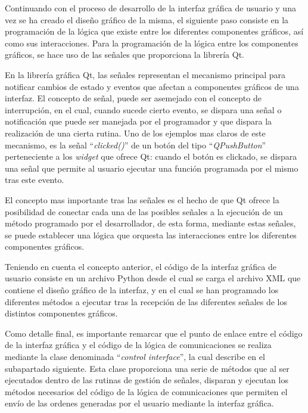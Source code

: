 Continuando con el proceso de desarrollo de la interfaz gráfica de usuario y una vez se ha creado el diseño gráfico de la misma, el siguiente paso consiste en la programación de la lógica que existe entre los diferentes componentes gráficos, así como sus interacciones. Para la programación de la lógica entre los componentes gráficos, se hace uso de las señales que proporciona la librería Qt.

En la librería gráfica Qt, las señales representan el mecanismo principal para notificar cambios de estado y eventos que afectan a componentes gráficos de una interfaz. El concepto de señal, puede ser asemejado con el concepto de interrupción, en el cual, cuando sucede cierto evento, se dispara una señal  o notificación que puede ser manejada por el programador y que dispara la realización de una cierta rutina. Uno de los ejemplos mas claros de este mecanismo, es la señal ``\textit{clicked()}'' de un botón del tipo ``\textit{QPushButton}'' perteneciente a los \textit{widget} que ofrece Qt: cuando el botón es clickado, se dispara una señal que  permite al usuario ejecutar una función programada por el mismo tras este evento. 

El concepto mas importante tras las señales es el hecho de que Qt ofrece la posibilidad de conectar cada una de las  posibles señales a la  ejecución de un método programado por el desarrollador, de esta forma, mediante estas señales, se puede establecer una lógica que orquesta las interacciones entre los diferentes componentes gráficos.

Teniendo en cuenta el concepto anterior, el código de la interfaz gráfica de usuario consiste en un archivo Python desde el cual se carga el archivo XML que contiene el diseño gráfico de la interfaz, y en el cual se han programado los diferentes métodos a ejecutar tras la recepción de las diferentes señales de los distintos componentes gráficos.

Como detalle final, es importante remarcar que el punto de enlace entre el código de la interfaz gráfica y el código de la lógica de comunicaciones se realiza mediante la clase denominada  ``\textit{control interface}'', la cual describe en el subapartado siguiente. Esta clase proporciona una serie de métodos que al ser ejecutados dentro de las rutinas de gestión de señales, disparan y ejecutan los métodos necesarios del código de la lógica de comunicaciones que permiten el envío de las ordenes generadas por el usuario mediante la interfaz gráfica.

